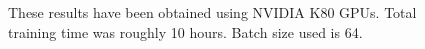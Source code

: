 \documentclass[final]{beamer}
\newlength{\sepwid}
\newlength{\onecolwid}
\newlength{\twocolwid}
\begin{document}
\begin{frame}[t]
\begin{columns}[t]
\begin{column}{\twocolwid}
\begin{columns}[t,totalwidth=\twocolwid] %

\begin{column}{\onecolwid} %

\begin{block}{}
These results have been obtained using NVIDIA K80 GPUs. Total training time was roughly 10 hours. Batch size used is 64.

\end{block}


\end{column} %

\begin{column}{\onecolwid} %

\begin{block}{}
{\footnotesize


}
\end{block}



\end{column} %


\end{columns} %

\end{column} %

\begin{column}{\sepwid}\end{column} %

\begin{column}{\onecolwid} %



\end{column}
\end{columns}
\end{frame}
\end{document}
